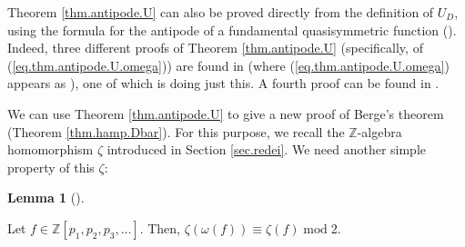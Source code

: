 \documentclass[numbers=enddot,12pt,final,onecolumn,notitlepage]{scrartcl}%
\numberwithin{exer}{section}
\theoremstyle{definition}
\newtheorem{lem}[theo]{Lemma}
\newenvironment{lemma}[1][]
{\begin{lem}[#1]\begin{leftbar}}
{\end{leftbar}\end{lem}}
\begin{document}
Theorem \ref{thm.antipode.U} can also be proved directly from the definition
of $U_{D}$, using the formula for the antipode of a fundamental quasisymmetric
function (\cite[(5.2.7)]{GriRei}). Indeed, three different proofs of Theorem
\ref{thm.antipode.U} (specifically, of (\ref{eq.thm.antipode.U.omega})) are
found in \cite{Chow96} (where (\ref{eq.thm.antipode.U.omega}) appears as
\cite[Corollary 2]{Chow96}), one of which is doing just this. A fourth proof
can be found in \cite[(6)]{Wisema07}.

We can use Theorem \ref{thm.antipode.U} to give a new proof of Berge's theorem
(Theorem \ref{thm.hamp.Dbar}). For this purpose, we recall the $\mathbb{Z}%
$-algebra homomorphism $\zeta$ introduced in Section \ref{sec.redei}. We need
another simple property of this $\zeta$:

\begin{lemma}
\label{lem.zeta.parity}Let $f\in\mathbb{Z}\left[  p_{1},p_{2},p_{3}%
,\ldots\right]  $. Then, $\zeta\left(  \omega\left(  f\right)  \right)
\equiv\zeta\left(  f\right)  \operatorname{mod}2$.
\end{lemma}
\end{document}
